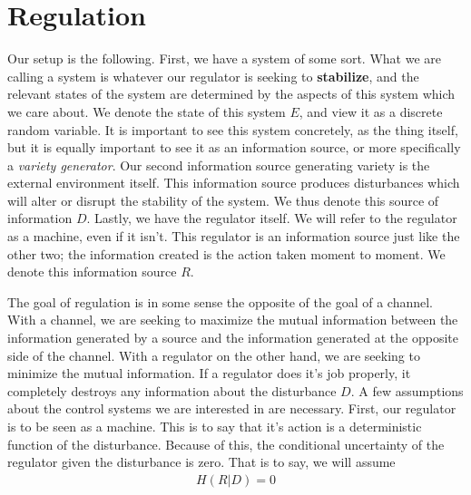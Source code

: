 \documentclass{article}
\theoremstyle{definition}
\theoremstyle{plain}
\begin{document}
\section{Regulation}
	Our setup is the following. First, we have a system of some sort.  
What we are calling a system is whatever our regulator is seeking to \textbf{stabilize}, and the relevant states of the system are determined by the aspects of this system which we care about. We denote the state of this system $E$, and view it as a discrete random variable. It is important to see this system concretely, as the thing itself, but it is equally important to see it as an information source, or more specifically a \emph{variety generator}. Our second information source generating variety is the external environment itself. This information source produces disturbances which will alter or disrupt the stability of the system. We thus denote this source of information $D$. Lastly, we have the regulator itself. We will refer to the regulator as a machine, even if it isn't. This regulator is an information source just like the other two; the information created is the action taken moment to moment. We denote this information source $R$. \par 
	The goal of regulation is in some sense the opposite of the goal of a channel. With a channel, we are seeking to maximize the mutual information between the information generated by a source and the information generated at the opposite side of the channel. With a regulator on the other hand, we are seeking to minimize the mutual information. If a regulator does it's job properly, it completely destroys any information about the disturbance $D$. A few assumptions about the control systems we are interested in are necessary. First, our regulator is to be seen as a machine. This is to say that it's action is a deterministic function of the disturbance. Because of this, the conditional uncertainty of the regulator given the disturbance is zero. That is to say, we will assume
	\begin{align}
		H(R|D) = 0
	\end{align}
\end{document}
